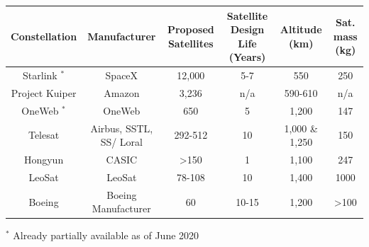 \bigskip
\begin{center}
\vspace{3mm}
\begin{adjustbox}{width=1\textwidth}
\begin{tabular}{||c| c |c |c |c |c||}
\hline
\textbf{Constellation} & \textbf{Manufacturer} & \textbf{Proposed Satellites} & \textbf{Satellite Design Life (Years)} & \textbf{Altitude (km)} & \textbf{Sat. mass (kg)}\\
\hline \hline 
Starlink $^*$ & SpaceX & 12,000 & 5-7 & 550 & 250 \\
Project Kuiper & Amazon & 3,236 %
& n/a & 590-610 & n/a\\
OneWeb $^*$ & OneWeb & 650 %
& 5 %
& 1,200 & 147\\
Telesat & Airbus, SSTL, SS/ Loral & 292-512 & 10 & 1,000 \& 1,250 & 150\\
Hongyun & CASIC & >150 %
& 1 & 1,100 & 247\\
LeoSat & LeoSat & 78-108 & 10 & 1,400 & 1000\\
Boeing & Boeing Manufacturer & 60 %
& 10-15 & 1,200 & >100\\
\hline
\end{tabular}
\label{table:internet}
\end{adjustbox}
\end{center}
\footnotesize{$^*$ {\scriptsize Already partially available as of June 2020}}
\bigskip

\normalsize

